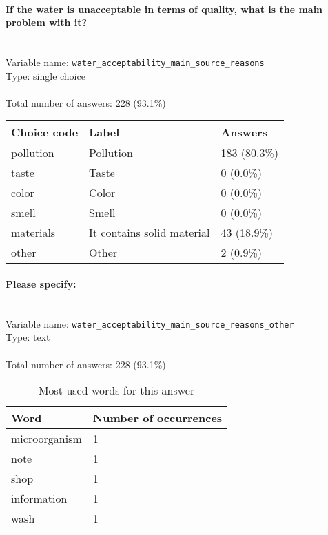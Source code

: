 \documentclass[11.5pt, a4paper]{scrartcl}
\begin{document}
\paragraph{If the water is unacceptable in terms of quality, what is the main problem with it?}
\  \\Variable name: \texttt{water\_acceptability\_main\_source\_reasons}\\
Type: single choice\\
\\Total number of answers: 228 (93.1\%)
\\[0.2em] \begin{tabular}{p{4cm}|p{8cm}|p{3cm}}
Choice code & Label & Answers \\
\hline
pollution & Pollution& \cellcolor{color4}183 (80.3\%)\\
\cellcolor{mygray} taste & \cellcolor{mygray}Taste & \cellcolor{color0}0 (0.0\%)\\
color & Color& \cellcolor{color0}0 (0.0\%)\\
\cellcolor{mygray} smell & \cellcolor{mygray}Smell & \cellcolor{color0}0 (0.0\%)\\
materials & It contains solid material& \cellcolor{color0}43 (18.9\%)\\
\cellcolor{mygray} other & \cellcolor{mygray}Other & \cellcolor{color0}2 (0.9\%)\\
\end{tabular}
\paragraph{Please specify:}
\  \\Variable name: \texttt{water\_acceptability\_main\_source\_reasons\_other}\\
Type: text\\
\\Total number of answers: 228 (93.1\%)
\\[0.2em]\begin{table}[H]
 \begin{tabular}{p{4cm}|p{8cm}}
Word & Number of occurrences  \\
\hline
\cellcolor{mygray}microorganism&\cellcolor{mygray}1\\
\hline
note&1\\
\hline
\cellcolor{mygray}shop&\cellcolor{mygray}1\\
\hline
information&1\\
\hline
\cellcolor{mygray}wash&\cellcolor{mygray}1\\
\hline
\end{tabular}
\caption{\label{tab:table-name} Most used words for this answer}
\end{table}
\end{document}
